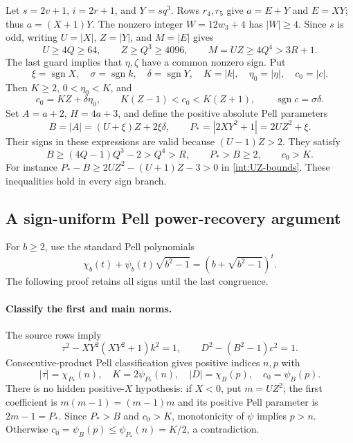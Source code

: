 Let $s=2v+1$, $i=2r+1$, and $Y=sq^3$.  Rows $r_4,r_5$ give
$a=E+Y$ and $E=XY$; thus $a=(X+1)Y$.
The nonzero integer $W=12w_3+4$ has $|W|\geq4$.  Since $s$ is odd,
writing $U=|X|$, $Z=|Y|$, and $M=|E|$ gives
\begin{equation}\label{int:UZ-bounds}
 U\geq4Q\geq64,\qquad Z\geq Q^3\geq4096,
 \qquad M=UZ\geq4Q^4>3R+1.
\end{equation}
The last guard implies that $\eta,\zeta$ have a common nonzero sign.
Put
\[
 \xi=\operatorname{sgn}X,\quad
 \sigma=\operatorname{sgn}k,\quad
 \delta=\operatorname{sgn}Y,\quad
 K=|k|,\quad \eta_0=|\eta|,\quad c_0=|c|.
\]
Then $K\geq2$, $0<\eta_0<K$, and
\begin{equation}\label{int:c-ratio}
 c_0=KZ+\delta\eta_0,\qquad
 K(Z-1)<c_0<K(Z+1),\qquad
 \operatorname{sgn}c=\sigma\delta.
\end{equation}
Set $A=a+2$, $H=4a+3$, and define the positive absolute Pell parameters
\[
 B=|A|=(U+\xi)Z+2\xi\delta,\qquad
 P_*=|2XY^2+1|=2UZ^2+\xi.
\]
Their signs in these expressions are valid because $(U-1)Z>2$.
They satisfy
\begin{equation}\label{int:BP-bounds}
 B\geq(4Q-1)Q^3-2>Q^4>R,\qquad P_*>B\geq2,\qquad c_0>K.
\end{equation}
For instance $P_*-B\geq2UZ^2-(U+1)Z-3>0$ in
\eqref{int:UZ-bounds}.  These inequalities hold in every sign branch.

\subsection{A sign-uniform Pell power-recovery argument}
\label{int:signed-power}

For $b\geq2$, use the standard Pell polynomials
\[
 \chi_b(t)+\psi_b(t)\sqrt{b^2-1}
       =(b+\sqrt{b^2-1})^t.
\]
The following proof retains all signs until the last congruence.

\paragraph{Classify the first and main norms.}
The source rows imply
\[
 \tau^2-XY^2(XY^2+1)k^2=1,\qquad
 D^2-(B^2-1)c^2=1.
\]
Consecutive-product Pell classification gives positive indices $n,p$ with
\begin{equation}\label{int:classify}
 |\tau|=\chi_{P_*}(n),\quad K=2\psi_{P_*}(n),\quad
 |D|=\chi_B(p),\quad c_0=\psi_B(p).
\end{equation}
There is no hidden positive-$X$ hypothesis: if $X<0$, put $m=UZ^2$;
the first coefficient is $m(m-1)=(m-1)m$ and its positive Pell parameter
is $2m-1=P_*$.  Since $P_*>B$ and $c_0>K$, monotonicity of $\psi$
implies $p>n$.  Otherwise
$c_0=\psi_B(p)\leq\psi_{P_*}(n)=K/2$, a contradiction.

